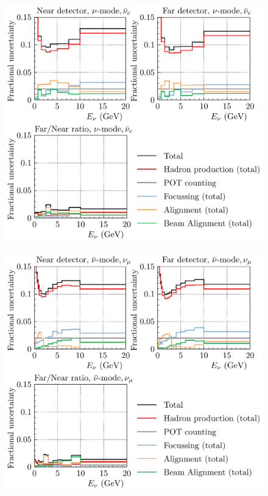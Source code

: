 \documentclass{article}
\begin{document}
\begin{figure}
  \includegraphics[width=\textwidth]{plots/fracerrs/numode_nuebar_ErrType}
  \caption{}
  \label{fig:grp_nu_nuebar}
\end{figure}

\begin{figure}
  \includegraphics[width=\textwidth]{plots/fracerrs/nubarmode_numu_ErrType}
  \caption{}
  \label{fig:grp_nubar_numu}
\end{figure}
\end{document}
